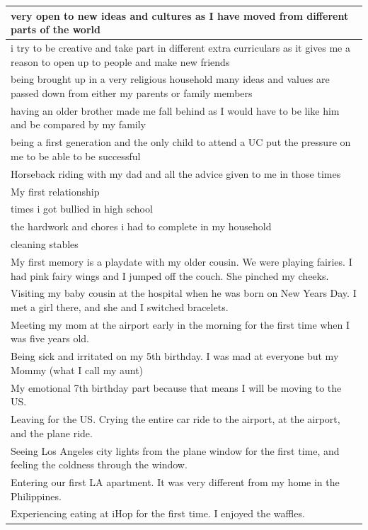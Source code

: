 \documentclass[
  .7em,
  letterpaper,
  DIV=11,
  numbers=noendperiod]{scrartcl}
\begin{document}
\begin{table}
\begin{tabular}{l}
very open to new ideas and cultures as I have moved from different parts of the world\\
\hline
i try to be creative and take part in different extra curriculars as it gives me a reason to open up to people and make new friends\\
\hline
being brought up in a very religious household many ideas and values are passed down from either my parents or family members\\
\hline
having an older brother made me fall behind as I would have to be like him and be compared by my family\\
\hline
being a first generation and the only child to attend a UC put the pressure on me to be able to be successful\\
\hline
Horseback riding with my dad and all the advice given to me in those times\\
\hline
My first relationship\\
\hline
times i got bullied in high school\\
\hline
the hardwork and chores i had to complete in my household\\
\hline
cleaning stables\\
\hline
My first memory is a playdate with my older cousin. We were playing fairies. I had pink fairy wings and I jumped off the couch. She pinched my cheeks.\\
\hline
Visiting my baby cousin at the hospital when he was born on New Years Day. I met a girl there, and she and I switched bracelets.\\
\hline
Meeting my mom at the airport early in the morning for the first time when I was five years old.\\
\hline
Being sick and irritated on my 5th birthday. I was mad at everyone but my Mommy (what I call my aunt)\\
\hline
My emotional 7th birthday part because that means I will be moving to the US.\\
\hline
Leaving for the US. Crying the entire car ride to the airport, at the airport, and the plane ride.\\
\hline
Seeing Los Angeles city lights from the plane window for the first time, and feeling the coldness through the window.\\
\hline
Entering our first LA apartment. It was very different from my home in the Philippines.\\
\hline
Experiencing eating at iHop for the first time. I enjoyed the waffles.\\

\end{tabular}
\end{table}
\end{document}
